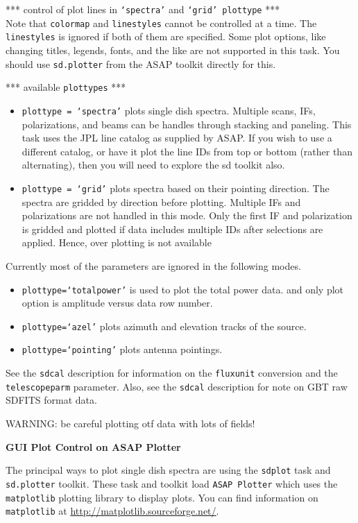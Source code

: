*** control of plot lines in {\tt `spectra'} and {\tt `grid' plottype} ***\\
Note that {\tt colormap} and {\tt linestyles} cannot be controlled at a time.
The {\tt linestyles} is ignored if both of them are specified.
Some plot options, like changing titles, legends, fonts,
and the like are not supported in this task.  You should use
{\tt sd.plotter} from the ASAP toolkit directly for this.

*** available {\tt plottypes} ***
\begin{itemize}
\item {\tt plottype = `spectra'} plots single dish spectra. Multiple
  scans, IFs, polarizations, and beams can be handles through stacking
  and paneling.  This task uses the JPL line catalog as supplied by
  ASAP.  If you wish to use a different catalog, or have it plot the
  line IDs from top or bottom (rather than alternating), then you will
  need to explore the sd toolkit also.
\item {\tt plottype = `grid'} plots spectra based on their pointing direction.
The spectra are gridded by direction before plotting.
Multiple IFs and polarizations are not handled in this mode. Only
the first IF and polarization is gridded and plotted if data 
includes multiple IDs after selections are applied. Hence, over
plotting is not available
\end{itemize}

Currently most of the parameters are ignored in the following modes.
\begin{itemize}
\item {\tt plottype=`totalpower'} is used to plot the total power data.
and only plot option is amplitude versus data row number.
\item {\tt plottype=`azel'} plots azimuth and elevation tracks of the source.
\item {\tt plottype=`pointing'} plots antenna pointings.
\end{itemize}

See the {\tt sdcal} description for information on the {\tt fluxunit} conversion
and the {\tt telescopeparm} parameter.
Also, see the {\tt sdcal} description for note on GBT raw SDFITS format data.

WARNING: be careful plotting otf data with lots of fields!


\bigskip
{\bf GUI Plot Control on ASAP Plotter}

The principal ways to plot single dish spectra are using 
the {\tt sdplot} task and {\tt sd.plotter} toolkit. 
These task and toolkit load {\tt ASAP Plotter} which uses 
the {\tt matplotlib} plotting library to display plots. 
You can find information on {\tt matplotlib} at
\url{http://matplotlib.sourceforge.net/}.

